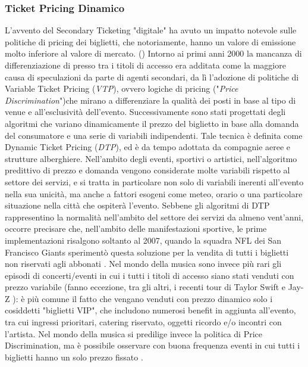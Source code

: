\subsubsection{Ticket Pricing Dinamico} \label{dtp}
L'avvento del Secondary Ticketing "digitale" ha avuto un impatto notevole sulle politiche di pricing dei biglietti, che notoriamente, hanno un valore di emissione molto inferiore al valore di mercato. (\cite{courty2014pricing})
Intorno ai primi anni 2000 la mancanza di differenziazione di presso tra i titoli di accesso era additata come la maggiore causa di speculazioni da parte di agenti secondari, da lì l'adozione di politiche di Variable Ticket Pricing (\textit{VTP}), ovvero logiche di pricing ("\textit{Price Discrimination}")che mirano a differenziare la qualità dei posti in base al tipo di venue e all'esclusività dell'evento. 
Successivamente sono stati progettati degli algoritmi che variano dinamicamente il prezzo del biglietto in base alla domanda del consumatore e una serie di variabili indipendenti. Tale tecnica è definita come Dynamic Ticket Pricing (\textit{DTP}), ed è da tempo adottata da compagnie aeree e strutture alberghiere.
Nell'ambito degli eventi, sportivi o artistici, nell'algoritmo predittivo di prezzo e domanda vengono considerate molte variabili rispetto al settore dei servizi, e si tratta in particolare non solo di variabili inerenti all'evento nella sua unicità, ma anche a fattori esogeni come meteo, orario o una particolare situazione nella città che ospiterà l'evento. 
Sebbene gli algoritmi di DTP rappresentino la normalità nell'ambito del settore dei servizi da almeno vent'anni, occorre precisare che, nell'ambito delle manifestazioni sportive, le prime implementazioni risalgono soltanto al 2007, quando la squadra NFL dei San Francisco Giants sperimentò questa soluzione per la vendita di tutti i biglietti non riservati agli abbonati \cite{article}. Nel mondo della musica sono invece più rari gli episodi di concerti/eventi in cui i tutti i titoli di accesso siano stati venduti con prezzo variabile (fanno eccezione, tra gli altri, i recenti tour di Taylor Swift e Jay-Z \cite{swiftrs}): è più comune il fatto che vengano venduti con prezzo dinamico solo i cosiddetti "biglietti VIP", che includono numerosi benefit in aggiunta all'evento, tra cui ingressi prioritari, catering riservato, oggetti ricordo e/o incontri con l'artista. 
Nel mondo della musica si predilige invece la politica di Price Discrimination, ma è possibile osservare con buona frequenza eventi in cui tutti i biglietti hanno un solo prezzo fissato \cite{courty2011unpriced, eckard2013impact}. 
